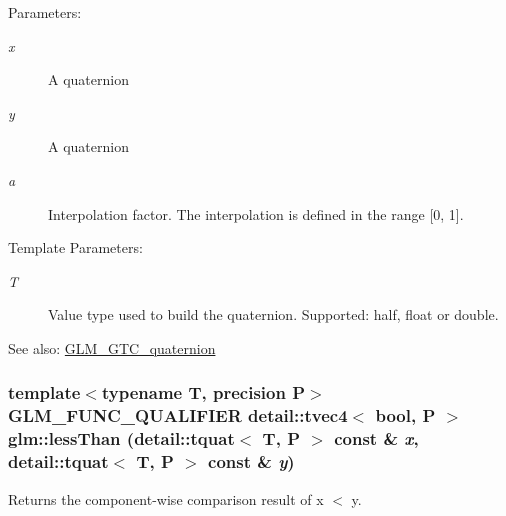 \begin{Desc}
\item[Parameters:]
\begin{description}
\item[{\em x}]A quaternion \item[{\em y}]A quaternion \item[{\em a}]Interpolation factor. The interpolation is defined in the range \mbox{[}0, 1\mbox{]}. \end{description}
\end{Desc}
\begin{Desc}
\item[Template Parameters:]
\begin{description}
\item[{\em T}]Value type used to build the quaternion. Supported: half, float or double. \end{description}
\end{Desc}
\begin{Desc}
\item[See also:]\hyperlink{group__gtc__quaternion}{GLM\_\-GTC\_\-quaternion} \end{Desc}
\hypertarget{group__gtc__quaternion_gf0ab4cfbc0f3e16f060fa4dd501b5dc1}{
\subsubsection[lessThan]{\setlength{\rightskip}{0pt plus 5cm}template$<$typename T, precision P$>$ GLM\_\-FUNC\_\-QUALIFIER detail::tvec4$<$ bool, P $>$ glm::lessThan (detail::tquat$<$ T, P $>$ const \& {\em x}, \/  detail::tquat$<$ T, P $>$ const \& {\em y})}}
\label{group__gtc__quaternion_gf0ab4cfbc0f3e16f060fa4dd501b5dc1}


Returns the component-wise comparison result of x $<$ y.

